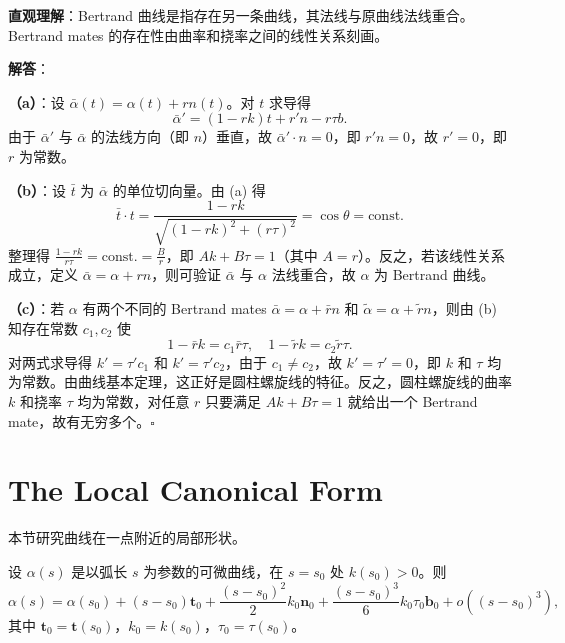 \begin{solution}
\textbf{直观理解}：Bertrand 曲线是指存在另一条曲线，其法线与原曲线法线重合。Bertrand  mates 的存在性由曲率和挠率之间的线性关系刻画。

\textbf{解答}：

\textbf{（a）}：设 $\bar{\alpha}(t) = \alpha(t) + rn(t)$。对 $t$ 求导得
\[
\bar{\alpha}' = (1 - rk)t + r'n - r\tau b.
\]
由于 $\bar{\alpha}'$ 与 $\bar{\alpha}$ 的法线方向（即 $n$）垂直，故 $\bar{\alpha}'\cdot n = 0$，即 $r'n = 0$，故 $r' = 0$，即 $r$ 为常数。

\textbf{（b）}：设 $\bar{t}$ 为 $\bar{\alpha}$ 的单位切向量。由 (a) 得
\[
\bar{t}\cdot t = \frac{1 - rk}{\sqrt{(1-rk)^2 + (r\tau)^2}} = \cos\theta = \text{const.}
\]
整理得 $\frac{1 - rk}{r\tau} = \text{const.} = \frac{B}{r}$，即 $Ak + B\tau = 1$（其中 $A = r$）。反之，若该线性关系成立，定义 $\bar{\alpha} = \alpha + rn$，则可验证 $\bar{\alpha}$ 与 $\alpha$ 法线重合，故 $\alpha$ 为 Bertrand 曲线。

\textbf{（c）}：若 $\alpha$ 有两个不同的 Bertrand mates $\bar{\alpha} = \alpha + \bar{r}n$ 和 $\tilde{\alpha} = \alpha + \tilde{r}n$，则由 (b) 知存在常数 $c_1, c_2$ 使
\[
1 - \bar{r}k = c_1\bar{r}\tau,\quad 1 - \tilde{r}k = c_2\tilde{r}\tau.
\]
对两式求导得 $k' = \tau'c_1$ 和 $k' = \tau'c_2$，由于 $c_1 \neq c_2$，故 $k' = \tau' = 0$，即 $k$ 和 $\tau$ 均为常数。由曲线基本定理，这正好是圆柱螺旋线的特征。反之，圆柱螺旋线的曲率 $k$ 和挠率 $\tau$ 均为常数，对任意 $r$ 只要满足 $Ak + B\tau = 1$ 就给出一个 Bertrand mate，故有无穷多个。$\square$
\end{solution}

\section{The Local Canonical Form}\label{sec:local-canonical-form-ch1}

本节研究曲线在一点附近的局部形状。

\begin{Theorem}[曲线在一点的局部标准形式]\label{th:local-canonical-form-ch1}
设 $\alpha(s)$ 是以弧长 $s$ 为参数的可微曲线，在 $s = s_0$ 处 $k(s_0) > 0$。则
\[
\alpha(s) = \alpha(s_0) + (s - s_0)\mathbf{t}_0 + \frac{(s - s_0)^2}{2}k_0\mathbf{n}_0 + \frac{(s - s_0)^3}{6}k_0\tau_0\mathbf{b}_0 + o((s - s_0)^3),
\]
其中 $\mathbf{t}_0 = \mathbf{t}(s_0)$，$k_0 = k(s_0)$，$\tau_0 = \tau(s_0)$。
\end{Theorem}


